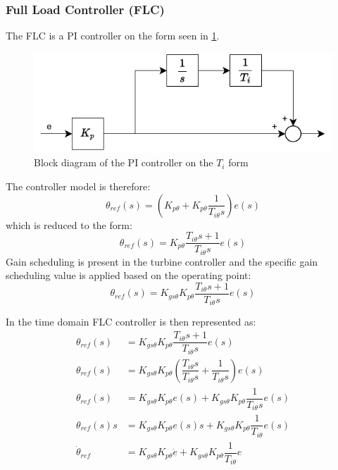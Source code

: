\subsubsection{Full Load Controller (FLC)} \label{sec:mod_wtLin_FLC}
The FLC is a PI controller on the form seen in \cref{fig:PIcontroller}.
\begin{figure}[h]
	\centering
	\includegraphics[width=0.5\linewidth]{Graphics/PiController.pdf}
	\caption{Block diagram of the PI controller on the \textit{$T_i$} form}
	\label{fig:PIcontroller}
\end{figure}
The controller model is therefore:
\begin{equation}\label{eq:wtlin_comp_flc_1}
	\theta_{ref}(s) = (K_{p \theta} + K_{p \theta} \dfrac{1}{T_{i \theta} s}) e(s)
\end{equation}
which is reduced to the form:
\begin{equation}\label{eq:wtlin_comp_flc_1}
	\theta_{ref}(s) = K_{p \theta}\dfrac{T_{i \theta} s + 1}{T_{i \theta} s} e(s)
\end{equation}
Gain scheduling is present in the turbine controller and the specific gain scheduling value is applied based on the operating point:
\begin{equation}\label{eq:wtlin_comp_flc_3}
	\theta_{ref}(s) = K_{gs \theta} K_{p \theta} \dfrac{T_{i \theta} s + 1}{T_{i \theta} s} e(s)
\end{equation}

In the time domain FLC controller is then represented as:
\begin{align}
	\theta_{ref}(s) & = K_{gs \theta} K_{p \theta} \dfrac{T_{i \theta} s + 1}{T_{i \theta} s} e(s) \\
	\theta_{ref}(s) & = K_{gs \theta} K_{p \theta} (\dfrac{T_{i \theta} s}{T_{i \theta} s} + \dfrac{1}{T_{i \theta} s}) e(s) \\
	\theta_{ref}(s) & = K_{gs \theta} K_{p \theta} e(s) +  K_{gs \theta} K_{p \theta} \dfrac{1}{T_{i \theta} s}e(s) \\
	\theta_{ref}(s) s & = K_{gs \theta} K_{p \theta} e(s) s +  K_{gs \theta} K_{p \theta} \dfrac{1}{T_{i \theta}}e(s) \\
	\dot{\theta}_{ref} & = K_{gs \theta} K_{p \theta} \dot{e} +  K_{gs \theta} K_{p \theta} \dfrac{1}{T_{i \theta}}e
\end{align}



